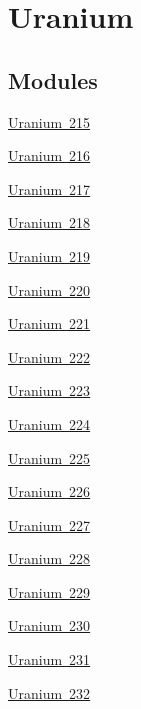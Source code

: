 \hypertarget{group___isotope_const-_uranium}{}\section{Uranium}
\label{group___isotope_const-_uranium}
\subsection*{Modules}
\begin{DoxyCompactItemize}
\item 
\mbox{\hyperlink{group___isotope_const-_uranium-_u215}{Uranium 215}}
\item 
\mbox{\hyperlink{group___isotope_const-_uranium-_u216}{Uranium 216}}
\item 
\mbox{\hyperlink{group___isotope_const-_uranium-_u217}{Uranium 217}}
\item 
\mbox{\hyperlink{group___isotope_const-_uranium-_u218}{Uranium 218}}
\item 
\mbox{\hyperlink{group___isotope_const-_uranium-_u219}{Uranium 219}}
\item 
\mbox{\hyperlink{group___isotope_const-_uranium-_u220}{Uranium 220}}
\item 
\mbox{\hyperlink{group___isotope_const-_uranium-_u221}{Uranium 221}}
\item 
\mbox{\hyperlink{group___isotope_const-_uranium-_u222}{Uranium 222}}
\item 
\mbox{\hyperlink{group___isotope_const-_uranium-_u223}{Uranium 223}}
\item 
\mbox{\hyperlink{group___isotope_const-_uranium-_u224}{Uranium 224}}
\item 
\mbox{\hyperlink{group___isotope_const-_uranium-_u225}{Uranium 225}}
\item 
\mbox{\hyperlink{group___isotope_const-_uranium-_u226}{Uranium 226}}
\item 
\mbox{\hyperlink{group___isotope_const-_uranium-_u227}{Uranium 227}}
\item 
\mbox{\hyperlink{group___isotope_const-_uranium-_u228}{Uranium 228}}
\item 
\mbox{\hyperlink{group___isotope_const-_uranium-_u229}{Uranium 229}}
\item 
\mbox{\hyperlink{group___isotope_const-_uranium-_u230}{Uranium 230}}
\item 
\mbox{\hyperlink{group___isotope_const-_uranium-_u231}{Uranium 231}}
\item 
\mbox{\hyperlink{group___isotope_const-_uranium-_u232}{Uranium 232}}

\end{DoxyCompactItemize}
